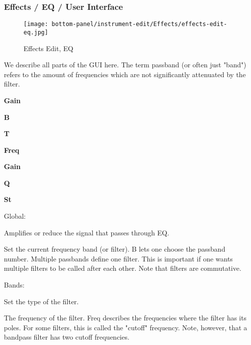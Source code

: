 %

\subsubsection{Effects / EQ / User Interface}
\label{subsubsec:effects_edit_eq_ui}

\begin{figure}[H]
   \centering 
   \texttt{[image: bottom-panel/instrument-edit/Effects/effects-edit-eq.jpg]}
   \caption{Effects Edit, EQ}
   \label{fig:effects_edit_eq}
\end{figure}

   We describe all parts of the GUI here. The term passband (or often just
   "band") refers to the amount of frequencies which are not
   significantly attenuated by the filter.

   \begin{enumber}
      \item \textbf{Gain}
      \item \textbf{B}
      \item \textbf{T}
      \item \textbf{Freq}
      \item \textbf{Gain}
      \item \textbf{Q}
      \item \textbf{St}
   \end{enumber}

Global:

   \setcounter{ItemCounter}{0}      %

   Amplifies or reduce the signal that passes through EQ.

   Set the current frequency band (or filter).
   B lets one choose the passband number. Multiple passbands define one
   filter. This is important if one wants multiple filters to be called
   after each other. Note that filters are commutative.

Bands:

   Set the type of the filter.

   The frequency of the filter.
   Freq describes the frequencies where the filter has its poles. For some
   filters, this is called the "cutoff" frequency. Note, however, that a
   bandpass filter has two cutoff frequencies.

